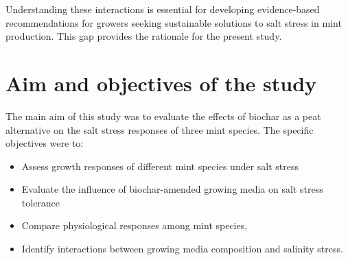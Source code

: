 Understanding these interactions is essential for developing evidence-based recommendations for growers seeking sustainable solutions to salt stress in mint production. This gap provides the rationale for the present study.

\section{Aim and objectives of the study}
The main aim of this study was to evaluate the effects of biochar as a peat alternative on the salt stress responses of three mint species. The specific objectives were to:

\begin{itemize}
    \item Assess growth responses of different mint species under salt stress
    \item Evaluate the influence of biochar-amended growing media on salt stress tolerance
    \item Compare physiological responses among mint species,
    \item Identify interactions between growing media composition and salinity stress.
\end{itemize}
